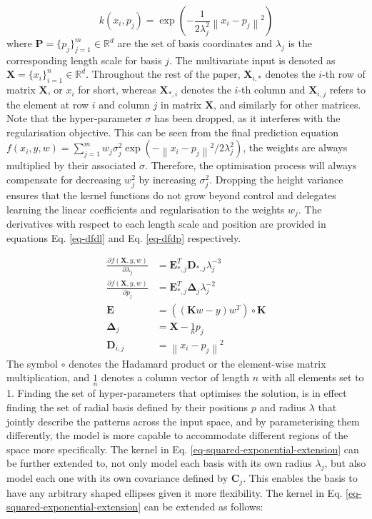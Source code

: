 \documentclass[useAMS,usenatbib,fleqn]{mn2e}
\newcommand{\bm}[1]{\mathbf{#1} }
\begin{document}
\begin{equation}
\label{eq-squared-exponential-extension}
k(x_{i},p_{j}) = \exp{\left(-\frac{1}{2\lambda_{j}^{2}}\left\| x_{i}-p_{j}\right\|^{2}\right)}
\end{equation} where $\bm{P}=\{p_{j}\}_{j=1}^{m} \in \mathbb{R}^{d}$ are the set of basis coordinates and $\lambda_{j}$ is the corresponding length scale for basis $j$. The multivariate input is denoted as $\bm{X}=\{x_{i}\}_{i=1}^{n} \in \mathbb{R}^{d}$. Throughout the rest of the paper, $\bm{X}_{i,*}$ denotes the $i$-th row of matrix $\bm{X}$, or $x_{i}$ for short, whereas $\bm{X}_{*,i}$ denotes the $i$-th column and $\bm{X}_{i,j}$ refers to the element at row $i$ and column $j$ in matrix $\bm{X}$, and similarly for other matrices. Note that the hyper-parameter $\sigma$ has been dropped, as it interferes with the regularisation objective. This can be seen from the final prediction equation $f(x_{i},y,w)=\sum_{j=1}^{m}w_{j}\sigma_{j}^{2}\exp{\left(-\left\| x_{i}-p_{j}\right\|^{2}/2\lambda_{j}^{2}\right)}$, the weights are always multiplied by their associated $\sigma$. Therefore, the optimisation process will always compensate for decreasing $w_{j}^{2}$ by increasing $\sigma_{j}^{2}$. Dropping the height variance ensures that the kernel functions do not grow beyond control and delegates learning the linear coefficients and regularisation to the weights $w_{j}$. The derivatives with respect to each length scale and position are provided in equations Eq. \eqref{eq-dfdl} and Eq. \eqref{eq-dfdp} respectively. 

\begin{subequations}
\begin{align} 
\label{eq-dfdl}
\frac{\partial f(\bm{X},y,w)}{\partial \lambda_{j}} &=\bm{E}_{*,j}^{T}\bm{D}_{*,j}\lambda_{j}^{-3}\\
\label{eq-dfdp}
\frac{\partial f(\bm{X},y,w)}{\partial p_{j}} &=\bm{E}_{*,j}^{T}\bm{\Delta}_{j}\lambda_{j}^{-2}\\
\bm{E}\phantom{_{i,j}} &= \left(\left(\bm{K}w-y\right)w^{T}\right)\circ\bm{K}\\
\bm{\Delta}_{j\phantom{,i}} &= \bm{X}-\underset{n}{1}p_{j}\\
\bm{D}_{i,j} &= \left \| x_{i}-p_{j}\right\|^{2}
\end{align}
\end{subequations} 
The symbol $\circ$ denotes the Hadamard product or the element-wise matrix multiplication, and $\underset{n}{1}$ denotes a column vector of length $n$ with all elements set to 1. Finding the set of hyper-parameters that optimises the solution, is in effect finding the set of radial basis defined by their positions $p$ and radius $\lambda$ that jointly describe the patterns across the input space, and by parameterising them differently, the model is more capable to accommodate different regions of the space more specifically. The kernel in Eq. \eqref{eq-squared-exponential-extension} can be further extended to, not only model each basis with its own radius $\lambda_{j}$, but also model each one with its own covariance defined by $\bm{C}_{j}$. This enables the basis to have any arbitrary shaped ellipses given it more flexibility. The kernel in Eq. \eqref{eq-squared-exponential-extension} can be extended as follows:
\end{document}
